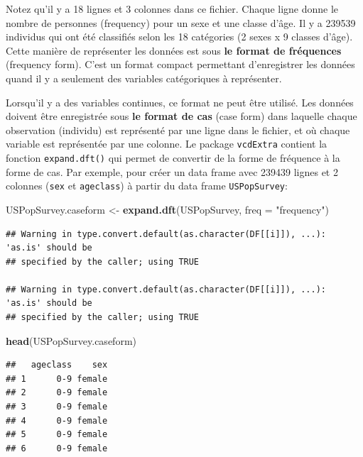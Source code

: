 \documentclass[
  12pt,
]{book}
\newenvironment{Shaded}{\begin{snugshade}}{\end{snugshade}}
\newcommand{\DataTypeTok}[1]{\textcolor[rgb]{0.13,0.29,0.53}{#1}}
\newcommand{\KeywordTok}[1]{\textcolor[rgb]{0.13,0.29,0.53}{\textbf{#1}}}
\newcommand{\NormalTok}[1]{#1}
\newcommand{\StringTok}[1]{\textcolor[rgb]{0.31,0.60,0.02}{#1}}
\begin{document}
Notez qu'il y a 18 lignes et 3 colonnes dans ce fichier. Chaque ligne donne le nombre de personnes (frequency) pour un sexe et une classe d'âge. Il y a 239539 individus qui ont été classifiés selon les 18 catégories (2 sexes x 9 classes d'âge). Cette manière de représenter les données est sous \textbf{le format de fréquences} (frequency form). C'est un format compact permettant d'enregistrer les données quand il y a seulement des variables catégoriques à représenter.

Lorsqu'il y a des variables continues, ce format ne peut être utilisé. Les données doivent être enregistrée sous \textbf{le format de cas} (case form) dans laquelle chaque observation (individu) est représenté par une ligne dans le fichier, et où chaque variable est représentée par une colonne. Le package \texttt{vcdExtra} contient la fonction \texttt{expand.dft()} qui permet de convertir de la forme de fréquence à la forme de cas. Par exemple, pour créer un data frame avec 239439 lignes et 2 colonnes (\texttt{sex} et \texttt{ageclass}) à partir du data frame \texttt{USPopSurvey}:

\begin{Shaded}
\begin{Highlighting}[]
\NormalTok{USPopSurvey.caseform \textless{}{-}}\StringTok{ }\KeywordTok{expand.dft}\NormalTok{(USPopSurvey, }\DataTypeTok{freq =} \StringTok{"frequency"}\NormalTok{)}
\end{Highlighting}
\end{Shaded}

\begin{verbatim}
## Warning in type.convert.default(as.character(DF[[i]]), ...): 'as.is' should be
## specified by the caller; using TRUE

## Warning in type.convert.default(as.character(DF[[i]]), ...): 'as.is' should be
## specified by the caller; using TRUE
\end{verbatim}

\begin{Shaded}
\begin{Highlighting}[]
\KeywordTok{head}\NormalTok{(USPopSurvey.caseform)}
\end{Highlighting}
\end{Shaded}

\begin{verbatim}
##   ageclass    sex
## 1      0-9 female
## 2      0-9 female
## 3      0-9 female
## 4      0-9 female
## 5      0-9 female
## 6      0-9 female
\end{verbatim}
\end{document}
